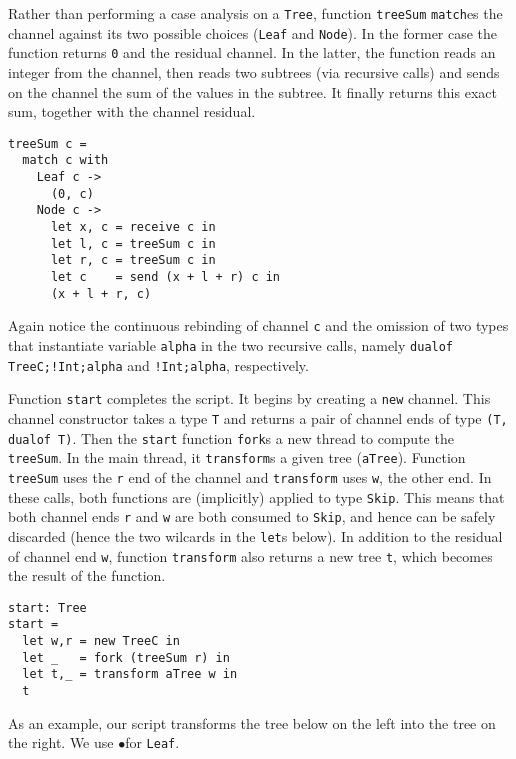 Rather than performing a case analysis on a \lstinline|Tree|, function
\lstinline|treeSum| \lstinline|match|es the channel against its two
possible choices (\lstinline|Leaf| and \lstinline|Node|). In the
former case the function returns \lstinline|0| and the residual
channel. In the latter, the function reads an integer from the
channel, then reads two subtrees (via recursive calls) and sends on
the channel the sum of the values in the subtree. It finally returns
this exact sum, together with the channel residual.
%
\begin{lstlisting}
treeSum c =
  match c with
    Leaf c ->
      (0, c)
    Node c ->
      let x, c = receive c in
      let l, c = treeSum c in
      let r, c = treeSum c in
      let c    = send (x + l + r) c in
      (x + l + r, c)
\end{lstlisting}

Again notice the continuous rebinding of channel \lstinline|c| and the
omission of two types that instantiate variable \lstinline|alpha| in
the two recursive calls, namely \lstinline|dualof TreeC;!Int;alpha|
and \lstinline|!Int;alpha|, respectively.

Function \lstinline|start| completes the script. It begins by creating
a \lstinline|new| channel. This channel constructor takes a type
\lstinline|T| and returns a pair of channel ends of type
%
\lstinline|(T, dualof T)|. Then the \lstinline|start| function
\lstinline|fork|s a new thread to compute the \lstinline|treeSum|. In
the main thread, it \lstinline|transform|s a given tree
(\lstinline|aTree|). Function \lstinline|treeSum| uses the
\lstinline|r| end of the channel and \lstinline|transform| uses
\lstinline|w|, the other end. In these calls, both functions are
(implicitly) applied to type \lstinline|Skip|. This means that both
channel ends \lstinline|r| and \lstinline|w| are both consumed to
\lstinline|Skip|, and hence can be safely discarded (hence the two
wilcards in the \lstinline|let|s below). In addition to the residual
of channel end \lstinline|w|, function \lstinline|transform| also
returns a new tree \lstinline|t|, which becomes the result of the
function.
%
\begin{lstlisting}
start: Tree
start =
  let w,r = new TreeC in
  let _   = fork (treeSum r) in
  let t,_ = transform aTree w in
  t
\end{lstlisting}

\newcommand{\leaf}{$\bullet$}

As an example, our script transforms the tree below on the left into
the tree on the right. We use \leaf for \lstinline|Leaf|.

